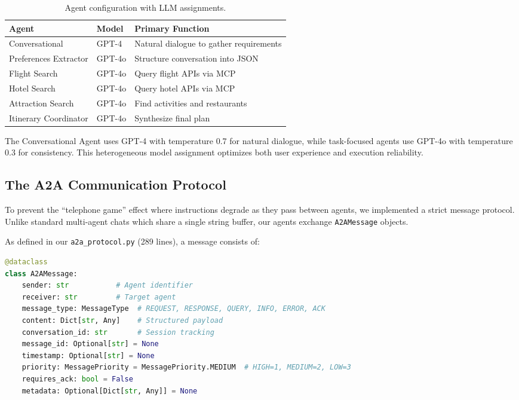 \documentclass[10pt,twocolumn]{article}
\begin{document}
\begin{table}[h]
\centering
\small
\begin{tabular}{p{2.2cm}p{1.3cm}p{3.5cm}}
\toprule
\textbf{Agent} & \textbf{Model} & \textbf{Primary Function} \\
\midrule
Conversational & GPT-4 & Natural dialogue to gather requirements \\
Preferences Extractor & GPT-4o & Structure conversation into JSON \\
Flight Search & GPT-4o & Query flight APIs via MCP \\
Hotel Search & GPT-4o & Query hotel APIs via MCP \\
Attraction Search & GPT-4o & Find activities and restaurants \\
Itinerary Coordinator & GPT-4o & Synthesize final plan \\
\bottomrule
\end{tabular}
\caption{Agent configuration with LLM assignments.}
\label{tab:agents}
\end{table}

The Conversational Agent uses GPT-4 with temperature 0.7 for natural dialogue, while task-focused agents use GPT-4o with temperature 0.3 for consistency. This heterogeneous model assignment optimizes both user experience and execution reliability.

\subsection{The A2A Communication Protocol}
To prevent the ``telephone game'' effect where instructions degrade as they pass between agents, we implemented a strict message protocol. Unlike standard multi-agent chats which share a single string buffer, our agents exchange \texttt{A2AMessage} objects.

As defined in our \texttt{a2a\_protocol.py} (289 lines), a message consists of:

\begin{lstlisting}[language=Python, caption=A2AMessage Dataclass Definition]
@dataclass
class A2AMessage:
    sender: str           # Agent identifier
    receiver: str         # Target agent
    message_type: MessageType  # REQUEST, RESPONSE, QUERY, INFO, ERROR, ACK
    content: Dict[str, Any]    # Structured payload
    conversation_id: str       # Session tracking
    message_id: Optional[str] = None
    timestamp: Optional[str] = None
    priority: MessagePriority = MessagePriority.MEDIUM  # HIGH=1, MEDIUM=2, LOW=3
    requires_ack: bool = False
    metadata: Optional[Dict[str, Any]] = None
\end{lstlisting}
\end{document}
